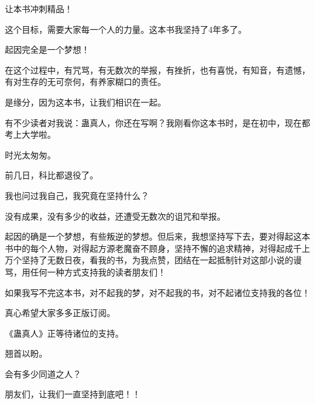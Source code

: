 \begin{this_body}
让本书冲刺精品！

这个目标，需要大家每一个人的力量。这本书我坚持了4年多了。

起因完全是一个梦想！

在这个过程中，有咒骂，有无数次的举报，有挫折，也有喜悦，有知音，有遗憾，有对生存的无可奈何，有养家糊口的责任。

是缘分，因为这本书，让我们相识在一起。

有不少读者对我说：蛊真人，你还在写啊？我刚看你这本书时，是在初中，现在都考上大学啦。

时光太匆匆。

前几日，科比都退役了。

我也问过我自己，我究竟在坚持什么？

没有成果，没有多少的收益，还遭受无数次的诅咒和举报。

起因的确是一个梦想，有些叛逆的梦想。但后来，我想坚持写下去，要对得起这本书中的每个人物，对得起方源老魔奋不顾身，坚持不懈的追求精神，对得起成千上万个坚持了无数日夜，看我的书，为我点赞，团结在一起抵制针对这部小说的谩骂，用任何一种方式支持我的读者朋友们！

如果我写不完这本书，对不起我的梦，对不起我的书，对不起诸位支持我的各位！

真心希望大家多多正版订阅。

《蛊真人》正等待诸位的支持。

翘首以盼。

会有多少同道之人？

朋友们，让我们一直坚持到底吧！！

\end{this_body}

